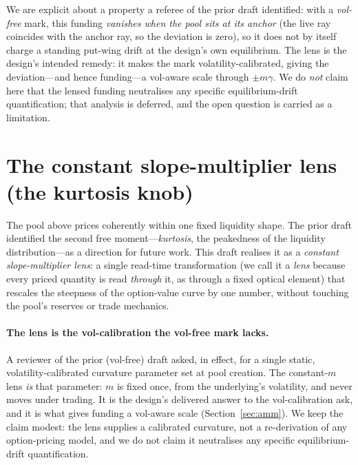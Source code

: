 \documentclass[runningheads]{llncs}
\begin{document}
We are explicit about a property a referee of the prior draft identified: with a
\emph{vol-free} mark, this funding \emph{vanishes when the pool sits at its
anchor} (the live ray coincides with the anchor ray, so the deviation is zero), so
it does not by itself charge a standing put-wing drift at the design's own
equilibrium. The lens is the design's intended remedy: it makes the mark
volatility-calibrated, giving the deviation---and hence funding---a vol-aware
scale through $\pm m\gamma$. We do \emph{not} claim here that the lensed funding
neutralises any specific equilibrium-drift quantification; that analysis is
deferred, and the open question is carried as a limitation.

\section{The constant slope-multiplier lens (the kurtosis knob)}\label{sec:lens}

The pool above prices coherently within one fixed liquidity shape. The prior
draft identified the second free moment---\emph{kurtosis}, the peakedness of the
liquidity distribution---as a direction for future work. This draft realises it
as a \emph{constant slope-multiplier lens}: a single read-time transformation
(we call it a \emph{lens} because every priced quantity is read \emph{through} it,
as through a fixed optical element) that rescales the steepness of the
option-value curve by one number, without touching the pool's reserves or trade
mechanics.

\paragraph{The lens is the vol-calibration the vol-free mark lacks.}
A reviewer of the prior (vol-free) draft asked, in effect, for a single static,
volatility-calibrated curvature parameter set at pool creation. The constant-$m$
lens \emph{is} that parameter: $m$ is fixed once, from the underlying's
volatility, and never moves under trading. It is the design's delivered answer to
the vol-calibration ask, and it is what gives funding a vol-aware scale
(Section~\ref{sec:amm}). We keep the claim modest: the lens supplies a calibrated
curvature, not a re-derivation of any option-pricing model, and we do not claim it
neutralises any specific equilibrium-drift quantification.
\end{document}
